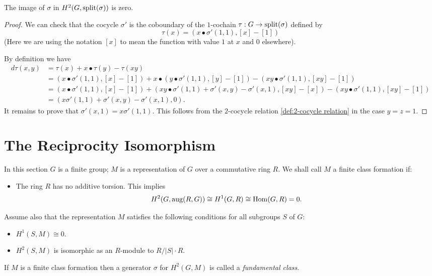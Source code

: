 \begin{lemma} \label{lem:splits in splitting module}
	The image of $\sigma$ in $H^2(G,\mathrm{split}(\sigma))$ is zero.
\end{lemma}

\begin{proof}
	We can check that the cocycle $\sigma'$ is the coboundary of
	the $1$-cochain $\tau : G \to \mathrm{split}(\sigma)$ defined by
	\[
		\tau (x) = (x \bullet σ'(1,1), [x]-[1])
	\]
	(Here we are using the notation $[x]$
	to mean the function with value $1$ at $x$ and $0$ elsewhere).

	By definition we have
	\begin{align*}
		d\tau (x,y)
		&= \tau(x) + x \bullet \tau(y) - \tau(xy) \\
		&=
		(x \bullet σ'(1,1), [x]-[1])
		+ x \bullet (y \bullet σ'(1,1), [y]-[1])
		-(xy \bullet σ'(1,1), [xy]-[1])\\
		&=
		(x \bullet σ'(1,1), [x]-[1])
		+ (xy \bullet σ'(1,1) + \sigma'(x,y) -\sigma'(x,1), [xy]-[x])
		- (xy \bullet σ'(1,1), [xy]-[1])\\
		&=
		(x \sigma'(1,1) + \sigma'(x,y) -\sigma'(x,1) , 0).
	\end{align*}
	It remains to prove that $\sigma'(x,1) = x \sigma'(1,1)$.
	This follows from the $2$-cocycle relation \ref{def:2-cocycle relation}	in the case $y=z=1$.
\end{proof}





\section{The Reciprocity Isomorphism}

\begin{definition} \label{def:fundamental class}
	In this section $G$ is a finite group; $M$ is a representation of $G$ over a commutative ring $R$.
	We shall call $M$ a finite class formation if:
	\begin{itemize}
		\item
		The ring $R$ has no additive torsion. This implies
		\[
			H^2(G,\mathrm{aug}(R,G)) \cong H^1(G,R) \cong \mathrm{Hom}(G,R) = 0.
		\]
	\end{itemize}
	Assume also that the representation $M$ satisfies the following conditions for all
 	subgroups $S$ of $G$:
	\begin{itemize}
		\item
		$H^1(S,M) \cong 0$.
		\item
		$H^2(S,M)$ is isomorphic as an $R$-module to $R / |S| \cdot R$.
	\end{itemize}
	If $M$ is a finite class formation then a generator $\sigma$ for $H^2(G,M)$ is called
	a \emph{fundamental class}.
\end{definition}


